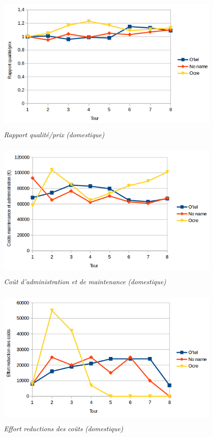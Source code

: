 \documentclass[a4paper,10pt]{article}
\begin{document}
    \begin{figure}[!ht]
      \begin{center}
	\includegraphics[height=7cm,keepaspectratio]{./images/rapport_qualite_prix.png}
      \end{center}
      \caption{\textit{Rapport qualité/prix (domestique)}}
    \end{figure}

    \begin{figure}[!ht]
      \begin{center}
	\includegraphics[height=7cm,keepaspectratio]{./images/cout_administration_et_maintenance.png}
      \end{center}
      \caption{\textit{Coût d'administration et de maintenance (domestique)}}
    \end{figure}

    
    \begin{figure}[!ht]
      \begin{center}
	\includegraphics[height=7cm,keepaspectratio]{./images/effort_reduction_couts.png}
      \end{center}
      \caption{\textit{Effort reductions des coûts (domestique)}}
      \label{effort_reduction_couts}
    \end{figure}
    
\end{document}
